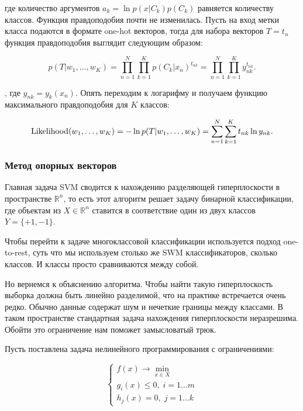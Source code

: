 где количество аргументов $a_k = \ln p(x|C_k)p(C_k)$ равняется количеству классов. Функция правдоподобия почти
не изменилась. Пусть на вход метки класса подаются в формате one-hot векторов, тогда для набора векторов $T =
{t_n}$ функция правдоподобия выглядит следующим образом:

\begin{equation}
 p(T|w_1,\ldots,w_K) = \prod_{n=1}^N \prod_{k=1}^K p(C_k|x_n)^{t_{nk}} = \prod_{n=1}^N \prod_{k=1}^K
y_{nk}^{t_{nk}}.
\end{equation}

, где $y_{nk} = y_k(x_n)$. Опять переходим к логарифму и получаем функцию максимального правдоподобия для $K$
классов:

\begin{equation}
 \operatorname*{Likelihood} (w_1,\ldots,w_K) = -\ln p(T|w_1,\ldots,w_K) = \sum_{n=1}^N \sum_{k=1}^K t_{nk}\ln y_{nk}.
\end{equation}


\subsubsection{Метод опорных векторов}

Главная задача SVM сводится к нахождению разделяющей гиперплоскости в пространстве $\mathbb{R}^n$, то есть этот алгоритм решает задачу бинарной классификации, где объектам из $X \in \mathbb{R}^n$ ставится в соответствие один из двух классов $Y = \{+1, -1\}$.

\bigskip
Чтобы перейти к задаче многоклассовой классификации используется подход one-to-rest, суть что мы используем столько же SWM классификаторов, сколько классов. И классы просто сравниваются между собой.

\bigskip
Но вернемся к объяснению алгоритма. Чтобы найти такую гиперплоскость выборка должна быть линейно разделимой, что на практике встречается очень редко. Обычно данные содержат шум и нечеткие границы между классами. В таком пространстве стандартная задача нахождения гиперплоскости неразрешима. Обойти это ограничение нам поможет замысловатый трюк.

\bigskip
Пусть поставлена задача нелинейного программирования с ограничениями:

$$
\begin{cases}
f(x) \to \min\limits_{x \in X} \\
g_i(x) \leq 0,\;i=1\ldots m \\
h_j(x) = 0,\;j=1\ldots k
\end{cases}
$$

